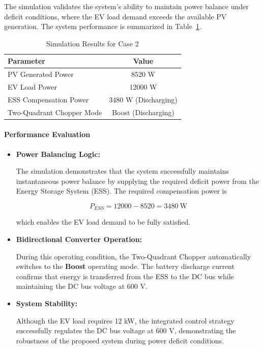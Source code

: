 \begin{itemize}
The simulation validates the system's ability to maintain power balance under deficit conditions, where the EV load demand exceeds the available PV generation. The system performance is summarized in Table~\ref{tab:case2}.

\begin{table}[H]
\centering
\caption{Simulation Results for Case 2}
\label{tab:case2}
\begin{tabular}{|l|c|}
\hline
\textbf{Parameter} & \textbf{Value} \\
\hline
PV Generated Power & 8520 W \\
EV Load Power & 12000 W \\
ESS Compensation Power & 3480 W (Discharging) \\
Two-Quadrant Chopper Mode & Boost (Discharging) \\
\hline
\end{tabular}
\end{table}

\paragraph{Performance Evaluation}

\begin{itemize}

\item \textbf{Power Balancing Logic:}

The simulation demonstrates that the system successfully maintains instantaneous power balance by supplying the required deficit power from the Energy Storage System (ESS). The required compensation power is

\begin{equation}
P_{ESS}=12000-8520=3480~\mathrm{W}
\end{equation}

which enables the EV load demand to be fully satisfied.

\item \textbf{Bidirectional Converter Operation:}

During this operating condition, the Two-Quadrant Chopper automatically switches to the \textbf{Boost} operating mode. The battery discharge current confirms that energy is transferred from the ESS to the DC bus while maintaining the DC bus voltage at 600 V.

\item \textbf{System Stability:}

Although the EV load requires 12 kW, the integrated control strategy successfully regulates the DC bus voltage at 600 V, demonstrating the robustness of the proposed system during power deficit conditions.


\end{itemize}
\end{itemize}
